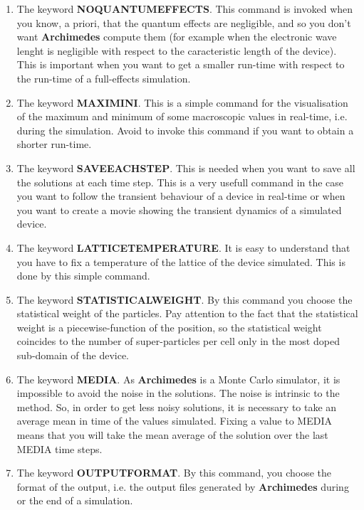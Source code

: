 \documentclass[12pt]{book}
\begin{document}
\begin{enumerate}
\item
The keyword \textbf{NOQUANTUMEFFECTS}. This command is invoked when you know, a priori, that the quantum effects are negligible, and so you don't want \textbf{Archimedes} compute them (for example when the electronic wave lenght is negligible with respect to the caracteristic length of the device). This is important when you want to get a smaller run-time with respect to the run-time of a full-effects simulation.

\item
The keyword \textbf{MAXIMINI}. This is a simple command for the visualisation of the maximum and minimum of some macroscopic values in real-time, i.e. during the simulation. Avoid to invoke this command if you want to obtain a shorter run-time.

\item
The keyword \textbf{SAVEEACHSTEP}. This is needed when you want to save all the solutions at each time step. This is a very usefull command in the case you want to follow the transient behaviour of a device in real-time or when you want to create a movie showing the transient dynamics of a simulated device.

\item
The keyword \textbf{LATTICETEMPERATURE}. It is easy to understand that you have to fix a temperature of the lattice of the device simulated. This is done by this simple command.

\item
The keyword \textbf{STATISTICALWEIGHT}. By this command you choose the statistical weight of the particles. Pay attention to the fact that the statistical weight is a piecewise-function of the position, so the statistical weight coincides to the number of super-particles per cell only in the most doped sub-domain of the device.

\item
The keyword \textbf{MEDIA}. As \textbf{Archimedes} is a Monte Carlo simulator, it is impossible to avoid the noise in the solutions. The noise is intrinsic to the method. So, in order to get less noisy solutions, it is necessary to take an average mean in time of the values simulated. Fixing a value to MEDIA means that you will take the mean average of the solution over the last MEDIA time steps.

\item
The keyword \textbf{OUTPUTFORMAT}. By this command, you choose the format of the output, i.e. the output files generated by \textbf{Archimedes} during or the end of a simulation.

\end{enumerate}
\end{document}
